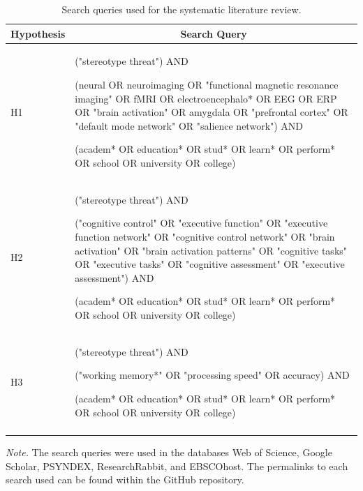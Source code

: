 \documentclass[
  stu, a4paper, 12pt,mask,floatsintext]{apa7}
\begin{document}
\begin{table}[tbp]

\begin{center}
\begin{threeparttable}

\caption{\label{tab:query_table}Search queries used for the systematic literature review.}

\small{

\begin{tabular}{p{4cm}p{12cm}}
\toprule
Hypothesis & \multicolumn{1}{c}{Search Query}\\
\midrule
H1 & ("stereotype threat") AND 

(neural OR neuroimaging OR "functional magnetic resonance imaging" OR fMRI OR electroencephalo* OR EEG OR ERP OR "brain activation" OR amygdala OR "prefrontal cortex" OR "default mode network" OR "salience network") AND 

(academ* OR education* OR stud* OR learn* OR perform* OR school OR university OR college)\\
H2 & ("stereotype threat") AND 

("cognitive control" OR "executive function" OR "executive function network" OR "cognitive control network" OR "brain activation" OR "brain activation patterns" OR "cognitive tasks" OR "executive tasks" OR "cognitive assessment" OR "executive assessment") AND 

(academ* OR education* OR stud* OR learn* OR perform* OR school OR university OR college)\\
H3 & ("stereotype threat") AND 

("working memory*" OR "processing speed" OR accuracy) AND 

(academ* OR education* OR stud* OR learn* OR perform* OR school OR university OR college)\\
\bottomrule
\addlinespace
\end{tabular}

}

\begin{tablenotes}[para]
\normalsize{\textit{Note.} \small The search queries were used in the databases Web of Science, Google Scholar, PSYNDEX, ResearchRabbit, and EBSCOhost. The permalinks to each search used can be found within the GitHub repository.}
\end{tablenotes}

\end{threeparttable}
\end{center}

\end{table}
\end{document}
